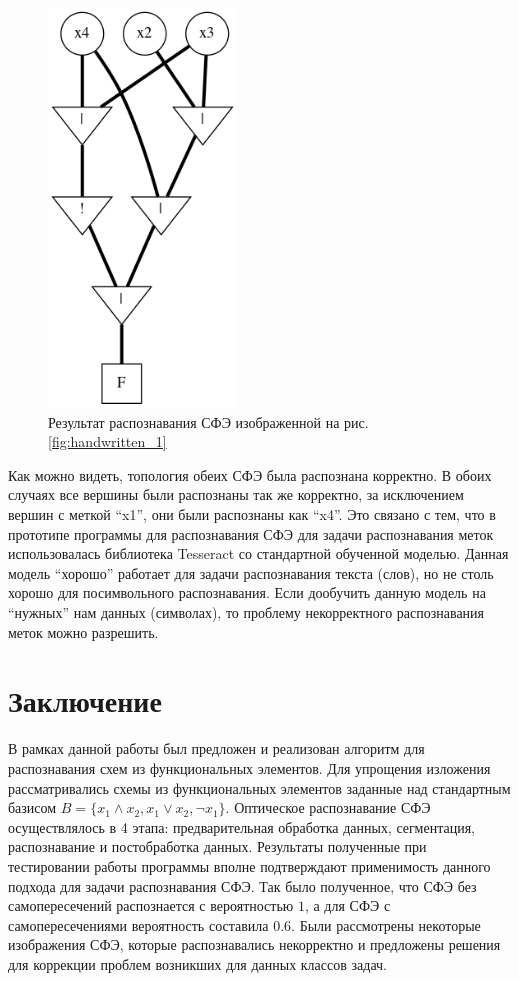\documentclass[makeidx, a4paper, 14pt]{extarticle}
\begin{document}
\begin{figure}[H]
    \centering
    \includegraphics[width=50mm]{handwritten_1_result.png}
    \caption{Результат распознавания СФЭ изображенной на рис. \ref{fig:handwritten_1}}
\end{figure}

Как можно видеть, топология обеих СФЭ была распознана корректно. В обоих случаях все вершины были распознаны так же корректно, за исключением вершин с меткой ``x1'', они были распознаны как ``x4''.
Это связано с тем, что в прототипе программы для распознавания СФЭ для задачи распознавания меток использовалась библиотека Tesseract со стандартной обученной моделью.
Данная модель ``хорошо'' работает для задачи распознавания текста (слов), но не столь хорошо для посимвольного распознавания.
Если дообучить данную модель на ``нужных'' нам данных (символах), то проблему некорректного распознавания меток можно разрешить.

\section{Заключение}
В рамках данной работы был предложен и реализован алгоритм для распознавания схем из функциональных элементов.
Для упрощения изложения рассматривались схемы из функциональных элементов заданные над стандартным базисом ${B = \{x_1 \wedge x_2, x_1 \vee x_2, \neg{x_1}\}}$.
Оптическое распознавание СФЭ осуществлялось в 4 этапа: предварительная обработка данных, сегментация, распознавание и постобработка данных.
Результаты полученные при тестировании работы программы вполне подтверждают применимость данного подхода для задачи распознавания СФЭ.
Так было полученное, что СФЭ без самопересечений распознается с вероятностью $1$, а для СФЭ с самопересечениями вероятность составила $0.6$.
Были рассмотрены некоторые изображения СФЭ, которые распознавались некорректно и предложены решения для коррекции проблем возникших для данных классов задач.
\end{document}

